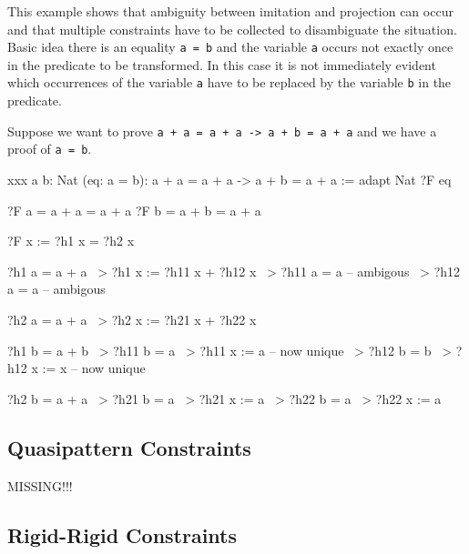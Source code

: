 This example shows that ambiguity between imitation and projection can occur and
that multiple constraints have to be collected to disambiguate the situation.
Basic idea there is an equality {\tt a = b} and the variable {\tt a} occurs not
exactly once in the predicate to be transformed. In this case it is not
immediately evident which occurrences of the variable {\tt a} have to be
replaced by the variable {\tt b} in the predicate.

Suppose we want to prove {\tt a + a = a + a -> a + b = a + a} and we have a
proof of {\tt a = b}.

\begin{alba}
    xxx {a b: Nat} (eq: a = b):  a + a = a + a -> a + b = a + a
    :=
        adapt {Nat} {?F} eq
\end{alba}


\begin{alba}
    ?F a = a + a = a + a
    ?F b = a + b = a + a

    ?F x := ?h1 x = ?h2 x

    ?h1 a = a + a       ~> ?h1 x := ?h11 x + ?h12 x
                        ~> ?h11 a = a       -- ambigous
                        ~> ?h12 a = a       -- ambigous

    ?h2 a = a + a       ~> ?h2 x := ?h21 x + ?h22 x

    ?h1 b = a + b       ~> ?h11 b = a           ~> ?h11 x := a  -- now unique
                        ~> ?h12 b = b           ~> ?h12 x := x  -- now unique

    ?h2 b = a + a       ~> ?h21 b = a           ~> ?h21 x := a
                        ~> ?h22 b = a           ~> ?h22 x := a

\end{alba}








\subsection{Quasipattern Constraints}


MISSING!!!








\subsection{Rigid-Rigid Constraints}

